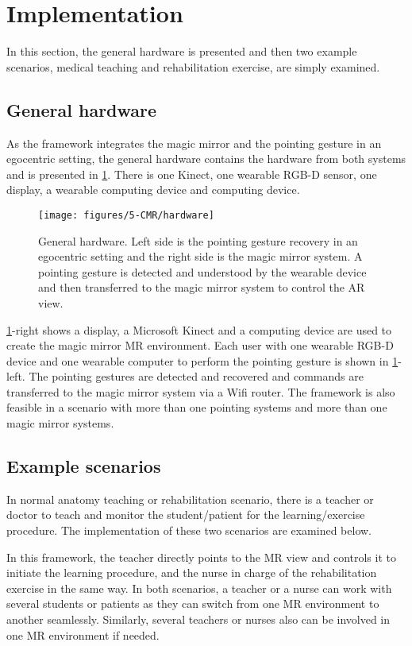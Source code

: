 \section{Implementation}
In this section, the general hardware is presented and then two example scenarios, medical teaching and rehabilitation exercise, are simply examined.

\subsection{General hardware}
As the framework integrates the magic mirror and the pointing gesture in an egocentric setting, the general hardware contains the hardware from both systems and is presented in \figurename{\ref{fig:5:hardware}}. 
There is one Kinect, one wearable RGB-D sensor, one display, a wearable computing device and computing device. 
\begin{figure}
\centering
\texttt{[image: figures/5-CMR/hardware]}
\caption{General hardware. Left side is the pointing gesture recovery in an egocentric setting and the right side is the magic mirror system. A pointing gesture is detected and understood by the wearable device and then transferred to the magic mirror system to control the AR view.}
\label{fig:5:hardware}
\end{figure}
\figurename{\ref{fig:5:hardware}-right} shows a display, a Microsoft Kinect and a computing device are used to create the magic mirror MR environment. Each user with one wearable RGB-D device and one wearable computer to perform the pointing gesture is shown in \figurename{\ref{fig:5:hardware}-left}. The pointing gestures are detected and recovered and commands are transferred to the magic mirror system via a Wifi router. The framework is also feasible in a scenario with more than one pointing systems and more than one magic mirror systems. 
 
\subsection{Example scenarios}
In normal anatomy teaching or rehabilitation scenario, there is a teacher or doctor to teach and monitor the student/patient for the learning/exercise procedure. The implementation of these two scenarios are examined below. 

In this framework, the teacher directly points to the MR view and controls it to initiate the learning procedure, and the nurse in charge of the rehabilitation exercise in the same way. In both scenarios, a teacher or a nurse can work with several students or patients as they can switch from one MR environment to another seamlessly. Similarly, several teachers or nurses also can be involved in one MR environment if needed. 

